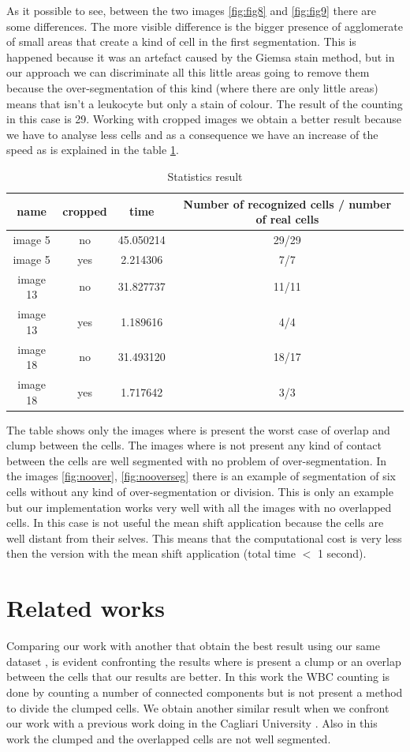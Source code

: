 As it possible to see, between the two images \ref{fig:fig8} and \ref{fig:fig9} there are some differences. The more visible difference is the bigger presence of agglomerate of small areas that create a kind of cell in the first segmentation. This is happened because it was an artefact caused by the Giemsa stain method, but in our approach we can discriminate all this little areas going to remove them because the over-segmentation of this kind (where there are only little areas) means that isn't a leukocyte but only a stain of colour. The result of the counting in this case is 29. 
Working with cropped images we obtain a better result because we have to analyse less cells and as a consequence we have an increase of the speed as is explained in the table \ref{statistics}.
\begin{table}
\centering
\begin{tabular}{|c|c|c|c|}
\hline 
name & cropped & time & Number of recognized cells / number of real cells\\ 
\hline 
image 5 & no & 45.050214 & 29/29\\ 
\hline 
image 5 & yes & 2.214306 & 7/7\\ 
\hline 
image 13 & no & 31.827737 & 11/11 \\ 
\hline 
image 13 & yes & 1.189616 & 4/4 \\ 
\hline 
image 18 & no & 31.493120 & 18/17\\ 
\hline 
image 18 & yes & 1.717642 & 3/3 \\ 
\hline 
\end{tabular} 
\caption{Statistics result}
\label{statistics}
\end{table}
The table shows only the images where is present the worst case of overlap and clump between the cells. The images where is not present any kind of contact between the cells are well segmented with no problem of over-segmentation. In the images  \ref{fig:noover}, \ref{fig:nooverseg} there is an example of segmentation of six cells without any kind of over-segmentation or division. This is only an example but our implementation works very well with all the images with no overlapped cells. In this case is not useful the mean shift application because the cells are well distant from their selves. This means that the computational cost is very less then the version with the mean shift application (total time $<$ 1 second).

\section{Related works}
Comparing our work with another that obtain the best result using our same dataset \cite{otherwork}, is evident confronting the results where is present a clump or an overlap between the cells that our results are better. In this work the WBC counting is done by counting a number of connected components but is not present a method to divide the clumped cells. We obtain another similar result when we confront our work with a previous work doing in the Cagliari University \cite{dirub}. Also in this work the clumped and the overlapped cells are not well segmented.

